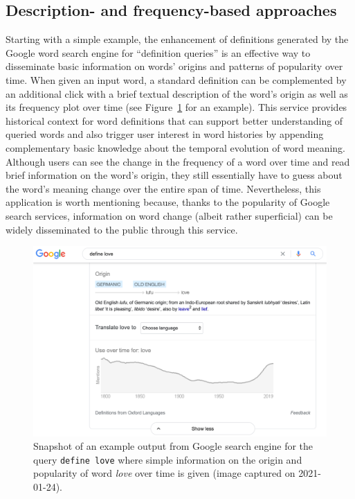 \documentclass[output=paper]{langsci/langscibook}
\begin{document}
\subsection{Description- and frequency-based approaches}
Starting with a simple example, the enhancement of definitions generated by the Google word search engine for ``definition queries'' is an effective way to disseminate basic information on words' origins and patterns of  popularity over time. When given an input word, a standard definition can be complemented by an additional click with a brief textual description of the word's origin as well as its frequency plot over time (see Figure~\ref{fig:google-snapshot} for an example). This service provides historical context for word definitions that can support better understanding of queried words and also trigger user interest in word histories by appending complementary basic knowledge about the temporal evolution of word meaning. Although users can see the change in the frequency of a word over time and read brief information on the word's origin, they still essentially have to guess about the word's meaning change over the entire span of time. Nevertheless, this application is worth mentioning because, thanks to the popularity of Google search services, information on word change (albeit rather superficial) can be widely disseminated to the public through this service.

\begin{figure}
	\includegraphics[width=\textwidth]{figures/JATOWT_google_snapshot.png}
        \caption{Snapshot of an example output from Google search engine for the query \texttt{define love} where simple information on the origin and popularity of word \textit{love} over time is given (image captured on 2021-01-24).}
	\label{fig:google-snapshot}
\end{figure}
\end{document}
